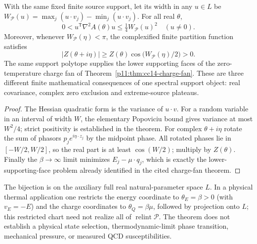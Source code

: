 \documentclass[12pt,a4paper]{article}
\begin{document}
\begin{corollary}
\label{p11:cor:cc15-polytope-triple-control}
With the same fixed finite source support, let its width in any
$u\in L$ be
$W_{\mathcal P}(u)=\max_j(u\cdot v_j)-\min_j(u\cdot v_j)$.
For all real $\theta$,
\[
 \boxed{0<u^{\mathsf T}\nabla^2 A(\theta)u
 \le\tfrac14 W_{\mathcal P}(u)^2\quad(u\ne0).}
\]
Moreover, whenever $W_{\mathcal P}(\eta)<\pi$, the complexified finite
partition function satisfies
\[
 \boxed{|Z(\theta+i\eta)|\ge
 Z(\theta)\cos\bigl(W_{\mathcal P}(\eta)/2\bigr)>0.}
\]
The same support polytope supplies the lower supporting faces of the
zero-temperature charge fan of
Theorem~\ref{p11:thm:cc14-charge-fan}. These are three different
finite mathematical consequences of one spectral support object:
real covariance, complex zero exclusion and extreme-source plateaus.
\end{corollary}
\begin{proof}
The Hessian quadratic form is the variance of $u\cdot v$. For a
random variable in an interval of width $W$, the elementary
Popoviciu bound gives variance at most $W^2/4$; strict positivity
is established in the theorem. For complex $\theta+i\eta$ rotate
the sum of phasors $p_j e^{i\eta\cdot z_j}$ by the midpoint phase.
All rotated phases lie in $[-W/2,W/2]$, so the real part is at
least $\cos(W/2)$; multiply by $Z(\theta)$. Finally the
$\beta\to\infty$ limit minimizes $E_j-\mu\cdot q_j$, which is
exactly the lower-supporting-face problem already identified in
the cited charge-fan theorem.
\end{proof}
\begin{remark}
The bijection is on the auxiliary full real natural-parameter space
$L$. In a physical thermal application one restricts the energy
coordinate to $\theta_E=\beta>0$ (with $v_E=-E$) and the charge
coordinates to $\theta_Q=\beta\mu$, followed by projection onto $L$; this restricted chart need not realize all
of $\operatorname{relint}\mathcal P$. The theorem does not establish
a physical state selection, thermodynamic-limit phase transition,
mechanical pressure, or measured QCD susceptibilities.
\end{remark}

\end{document}
